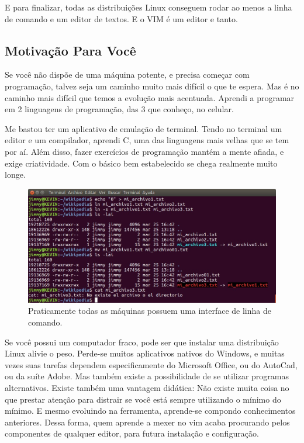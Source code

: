 E para finalizar, todas as distribuições Linux conseguem rodar ao menos a linha de comando e um editor de textos.
E o VIM é um editor e tanto.

\subsection{Motivação Para Você}
Se você não dispõe de uma máquina potente, e precisa começar com programação, talvez seja um caminho muito mais difícil o que te espera.
Mas é no caminho mais difícil que temos a evolução mais acentuada.
Aprendi a programar em 2 linguagens de programação, das 3 que conheço, no celular.

Me bastou ter um aplicativo de emulação de terminal.
Tendo no terminal um editor e um compilador, aprendi C, uma das linguagens mais velhas que se tem por aí.
Além disso, fazer exercícios de programação mantém a mente afiada, e exige criatividade.
Com o básico bem estabelecido se chega realmente muito longe.

\begin{figure}[!h]
\centering
\includegraphics[scale=0.4]{motivacao/Linha_De_Comando.jpg}
\caption{Praticamente todas as máquinas possuem uma interface de linha de comando.}
\end{figure}

Se você possui um computador fraco, pode ser que instalar uma distribuição Linux alivie o peso.
Perde-se muitos aplicativos nativos do Windows, e muitas vezes suas tarefas dependem especificamente do Microsoft Office, ou do AutoCad, ou da suíte Adobe.
Mas também existe a possibilidade de se utilizar programas alternativos.
Existe também uma vantagem didática:
Não existe muita coisa no que prestar atenção para distrair se você está sempre utilizando o mínimo do mínimo.
E mesmo evoluindo na ferramenta, aprende-se compondo conhecimentos anteriores.
Dessa forma, quem aprende a mexer no vim acaba procurando pelos componentes de qualquer editor, para futura instalação e configuração.

